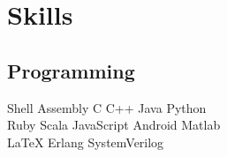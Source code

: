 \documentclass[]{deedy-resume-openfont}
\begin{document}
\begin{minipage}[t]{0.35\textwidth}




\section{Skills}
\subsection{Programming}
Shell \textbullet{} Assembly \textbullet{} C \textbullet{} C++ \textbullet{} Java \textbullet{} Python \\
Ruby \textbullet{} Scala \textbullet{} JavaScript \textbullet{} Android \textbullet{} Matlab \\
\LaTeX \textbullet{} Erlang \textbullet{} SystemVerilog


\end{minipage}
\end{document}
